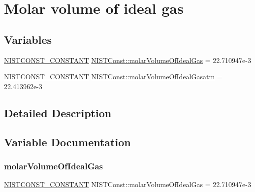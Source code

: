 \hypertarget{group___n_i_s_t_const-_molar_volume}{}\section{Molar volume of ideal gas}
\label{group___n_i_s_t_const-_molar_volume}
\subsection*{Variables}
\begin{DoxyCompactItemize}
\item 
\mbox{\hyperlink{_n_i_s_t_const_8hpp_a2b0fc1d7452373f816175dd86ce26729}{N\+I\+S\+T\+C\+O\+N\+S\+T\+\_\+\+C\+O\+N\+S\+T\+A\+NT}} \mbox{\hyperlink{group___n_i_s_t_const-_molar_volume_ga3175d5facd09d9633cd05eca4d9246fa}{N\+I\+S\+T\+Const\+::molar\+Volume\+Of\+Ideal\+Gas}} = 22.\+710947e-\/3
\item 
\mbox{\hyperlink{_n_i_s_t_const_8hpp_a2b0fc1d7452373f816175dd86ce26729}{N\+I\+S\+T\+C\+O\+N\+S\+T\+\_\+\+C\+O\+N\+S\+T\+A\+NT}} \mbox{\hyperlink{group___n_i_s_t_const-_molar_volume_gabc17d301cfbbfc12ffc1caa75c4a4602}{N\+I\+S\+T\+Const\+::molar\+Volume\+Of\+Ideal\+Gasatm}} = 22.\+413962e-\/3
\end{DoxyCompactItemize}


\subsection{Detailed Description}


\subsection{Variable Documentation}
\mbox{\label{group___n_i_s_t_const-_molar_volume_ga3175d5facd09d9633cd05eca4d9246fa}} 
\subsubsection{\texorpdfstring{molar\+Volume\+Of\+Ideal\+Gas}{molarVolumeOfIdealGas}}
{\footnotesize\ttfamily \mbox{\hyperlink{_n_i_s_t_const_8hpp_a2b0fc1d7452373f816175dd86ce26729}{N\+I\+S\+T\+C\+O\+N\+S\+T\+\_\+\+C\+O\+N\+S\+T\+A\+NT}} N\+I\+S\+T\+Const\+::molar\+Volume\+Of\+Ideal\+Gas = 22.\+710947e-\/3}

